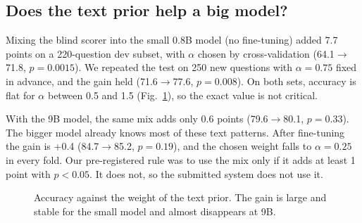 \subsection{Does the text prior help a big model?}
\label{sec:prior}
Mixing the blind scorer into the small 0.8B model (no fine-tuning) added 7.7
points on a 220-question dev subset, with $\alpha$ chosen by
cross-validation (64.1$\to$71.8, $p{=}0.0015$). We repeated the test on 250
new questions with $\alpha{=}0.75$ fixed in advance, and the gain held
(71.6$\to$77.6, $p{=}0.008$). On both sets, accuracy is flat for $\alpha$
between 0.5 and 1.5 (Fig.~\ref{fig:alpha}), so the exact value is not
critical.

With the 9B model, the same mix adds only 0.6 points (79.6$\to$80.1,
$p{=}0.33$). The bigger model already knows most of these text patterns.
After fine-tuning the gain is +0.4 (84.7$\to$85.2, $p{=}0.19$), and the
chosen weight falls to $\alpha{=}0.25$ in every fold. Our pre-registered
rule was to use the mix only if it adds at least 1 point with $p{<}0.05$.
It does not, so the submitted system does not use it.

\begin{figure}[t]
\centering
{}
\caption{Accuracy against the weight of the text prior. The gain is large
and stable for the small model and almost disappears at 9B.}
\label{fig:alpha}
\end{figure}



